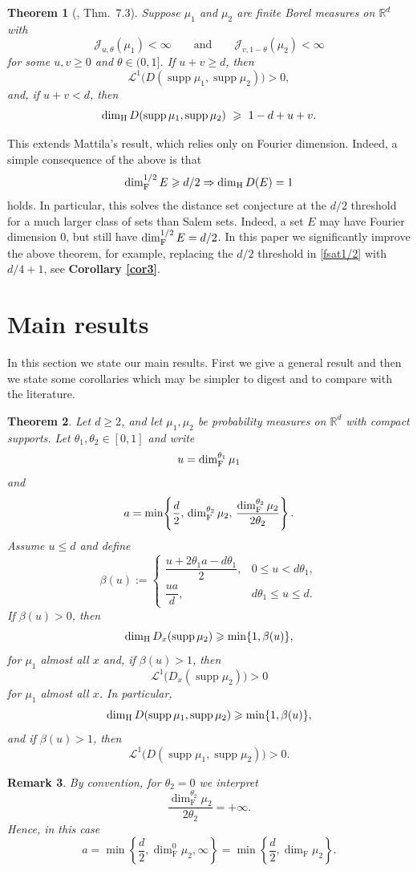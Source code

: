 \documentclass[11pt]{amsart}
\numberwithin{equation}{section}
\renewcommand{\ge}{\geqslant}
\renewcommand{\le}{\leqslant}
\renewcommand{\geq}{\geqslant}
\renewcommand{\leq}{\leqslant}
\newcommand{\hd}{\dim_{\textup{H}}}
\newtheorem{theorem}{Theorem}[section]
\newtheorem{remark}[theorem]{Remark}
\newcommand{\spt}{\operatorname{supp}}
\theoremstyle{plain}
\theoremstyle{remark}
\newcommand{\Rd}{\mathbb{R}^d}
\newcommand{\cL}{\mathcal{L}}
\begin{document}
\begin{theorem} [\cite{JMF}, Thm.~7.3]
\label{jfthm}
Suppose $\mu_1$ and $\mu_2$ are finite Borel measures on $\mathbb{R}^d$ with
\[
\mathcal{J}_{u,\theta}(\mu_1)<\infty
\qquad\text{and}\qquad
\mathcal{J}_{v,1-\theta}(\mu_2)<\infty
\]
for some $u,v\ge 0$ and $\theta\in(0,1]$. If $u+v\ge d$, then
\[
\mathcal{L}^1\!\big(D(\spt \mu_1,\spt \mu_2)\big)>0,
\]
and, if $u+v<d$, then
\[
\hd D(\spt\mu_1,\spt \mu_2)\ \ge\ 1-d+u+v.
\]
\end{theorem}

This extends Mattila’s result, which relies only on Fourier dimension. Indeed, a simple consequence of the above is that 
\begin{equation} \label{fsat1/2}
\dim_{\textup{F}}^{1/2} E \geq d/2 \Rightarrow \hd D(E) = 1
\end{equation}
 holds. In particular, this solves the distance set conjecture at the $d/2$ threshold for a much larger class of sets than Salem sets. Indeed, a set $E$ may have Fourier dimension 0, but still have  $\dim_{\textup{F}}^{1/2} E = d/2 $.  In this paper we significantly improve the above theorem, for example, replacing the $d/2$ threshold in \eqref{fsat1/2} with $d/4+1$, see {\bf Corollary \ref{cor3}}.


\section{Main results} \label{sec:results}

In this section we state our main results.  First we give a general result and then we state some  corollaries which may be simpler to digest and to compare with the literature. 

  

\begin{theorem}\label{thm-ref}
Let \(d\ge 2\), and let \(\mu_1,\mu_2\) be probability measures on \(\Rd\) with
compact supports. Let $\theta_1,\theta_2 \in [0,1]$ and write
\[
u = \dim_\textup{F}^{\theta_1} \mu_1
\]
and
\[
a=\min\!\left\{\frac d2,\,\dim_\textup{F}^{\theta_2} \mu_2, \, \frac{\dim_\textup{F}^{\theta_2} \mu_2}{2\theta_2}\right\}.
\]
Assume $u \leq d$ and define
\[
\beta(u):=
\begin{cases}
\dfrac{u+2\theta_1 a-d\theta_1}{2},
& 0\le u<d\theta_1,\\[2ex]
\dfrac{ua}{d},
& d\theta_1\le u\le d.
\end{cases}
\]
If \(\beta(u)>0\), then
\[
\hd D_x(\spt\mu_2)\ge \min\{1,\beta(u)\},
\]
for $\mu_1$ almost all $x$ and, if \(\beta(u)>1\), then
\[
\cL^1\bigl(D_x(\spt\mu_2)\bigr)>0
\]
for $\mu_1$ almost all $x$. In particular,
\[
\hd D(\spt\mu_1,\spt\mu_2)\ge \min\{1,\beta(u)\},
\]
and if \(\beta(u)>1\), then
\[
\cL^1\bigl(D(\spt\mu_1,\spt\mu_2)\bigr)>0.
\]
\end{theorem}
\begin{remark}
By convention, for $\theta_2=0$ we interpret
\[
\frac{\dim_{\mathrm F}^{\theta_2}\mu_2}{2\theta_2}=+\infty.
\]
Hence, in this case
\[
a=\min\left\{\frac d2,\dim_{\mathrm F}^{0}\mu_2, \infty\right\}
=\min\left\{\frac d2,\dim_{\mathrm F}\mu_2\right\}.
\]
\end{remark}
\end{document}
